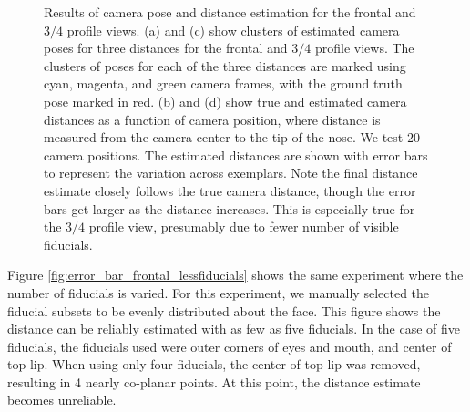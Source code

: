 \documentclass[runningheads]{llncs}
\begin{document}
\begin{figure}[ht!]
\begin{tabular}{cc}
\end{tabular}
\caption{	
Results of camera pose and distance estimation for the frontal and $3/4$ profile views.
(a) and (c) show clusters of estimated camera poses for three distances for the frontal and $3/4$ profile views.
The clusters of poses for each of the three distances are marked using cyan, magenta, and green camera frames, with the ground truth pose marked in red.
(b) and (d) show true and estimated camera distances as a function of camera position, where distance is measured from the camera center to the tip of the nose.
We test $20$ camera positions.
The estimated distances are shown with error bars to represent the variation across exemplars.
Note the final distance estimate closely follows the true camera distance, though the error bars get larger as the distance increases.  
This is especially true for the $3/4$ profile view, presumably due to fewer number of visible fiducials.   
}
\label{fig:results}
\end{figure}

Figure \ref{fig:error_bar_frontal_lessfiducials} shows the same experiment where the number of fiducials is varied.  
For this experiment, we manually selected the fiducial subsets to be evenly distributed about the face.  
This figure shows the distance can be reliably estimated with as few as five fiducials.  
In the case of five fiducials, the fiducials used were outer corners of eyes and mouth, and center of top lip.
When using only four fiducials, the center of top lip was removed, resulting in 4 nearly co-planar points.
At this point, the distance estimate becomes unreliable.
\end{document}
